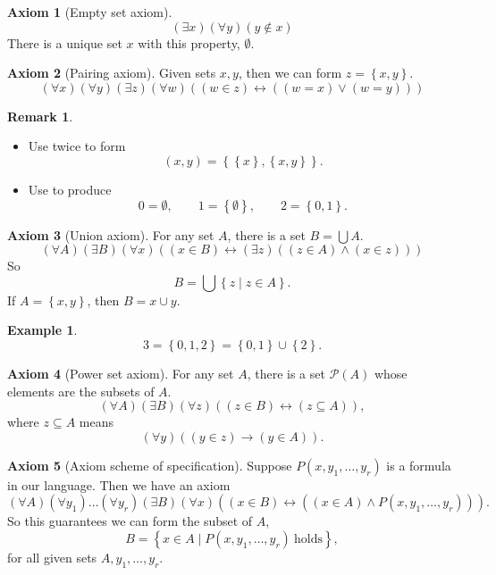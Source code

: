 \documentclass{article}
\newcommand{\rb}[1]{\left( #1 \right)}
\newcommand{\cb}[1]{\left\{ #1 \right\}}
\newcommand{\orb}[2]{\rb{#1 \lor #2}}
\newcommand{\andb}[2]{\rb{#1 \land #2}}
\newcommand{\impb}[2]{\rb{#1 \rightarrow #2}}
\newcommand{\iffb}[2]{\rb{#1 \leftrightarrow #2}}
\newcommand{\fab}[1]{\rb{\forall #1}}
\newcommand{\teb}[1]{\rb{\exists #1}}
\newcommand{\eqb}[2]{\rb{#1 = #2}}
\newcommand{\inb}[2]{\rb{#1 \in #2}}
\newcommand{\nib}[2]{\rb{#1 \notin #2}}
\newcommand{\subb}[2]{\rb{#1 \subseteq #2}}
\theoremstyle{definition}\newtheorem{definition}{Definition}[subsection]
\theoremstyle{definition}\newtheorem{remark1}[definition]{Remark}
\theoremstyle{definition}\newtheorem{example1}[definition]{Example}
\theoremstyle{definition}\newtheorem*{remark2}{Remark}
\theoremstyle{definition}\newtheorem*{example2}{Example}
\theoremstyle{definition}\newtheorem*{note}{Note}
\theoremstyle{definition}\newtheorem*{notation}{Notation}
\newtheorem{axiom}{Axiom}
\begin{document}
\begin{axiom}[Empty set axiom]
$$ \teb{x}\fab{y}\nib{y}{x} $$
There is a unique set $ x $ with this property, $ \emptyset $.
\end{axiom}


\begin{axiom}[Pairing axiom]
Given sets $ x, y $, then we can form $ z = \cb{x, y} $.
$$ \fab{x}\fab{y}\teb{z}\fab{w}\iffb{\inb{w}{z}}{\orb{\eqb{w}{x}}{\eqb{w}{y}}} $$
\end{axiom}

\begin{remark2}
\hfill
\begin{itemize}
\item Use twice to form
$$ \rb{x, y} = \cb{\cb{x}, \cb{x, y}}. $$
\item Use to produce
$$ 0 = \emptyset, \qquad 1 = \cb{\emptyset}, \qquad 2 = \cb{0, 1}. $$
\end{itemize}
\end{remark2}

\begin{axiom}[Union axiom]
For any set $ A $, there is a set $ B = \bigcup A $.
$$ \fab{A}\teb{B}\fab{x}\iffb{\inb{x}{B}}{\teb{z}\andb{\inb{z}{A}}{\inb{x}{z}}} $$
So
$$ B = \bigcup \cb{z \mid z \in A}. $$
If $ A = \cb{x, y} $, then $ B = x \cup y $.
\end{axiom}

\begin{example2}
$$ 3 = \cb{0, 1, 2} = \cb{0, 1} \cup \cb{2}. $$
\end{example2}

\begin{axiom}[Power set axiom]
For any set $ A $, there is a set $ \mathcal{P}\rb{A} $ whose elements are the subsets of $ A $.
$$ \fab{A}\teb{B}\fab{z}\iffb{\inb{z}{B}}{\subb{z}{A}}, $$
where $ z \subseteq A $ means
$$ \fab{y}\impb{\inb{y}{z}}{\inb{y}{A}}. $$
\end{axiom}

\pagebreak

\begin{axiom}[Axiom scheme of specification]
Suppose $ P\rb{x, y_1, \dots, y_r} $ is a formula in our language. Then we have an axiom
$$ \fab{A}\fab{y_1} \dots \fab{y_r}\teb{B}\fab{x}\iffb{\inb{x}{B}}{\andb{\inb{x}{A}}{P\rb{x, y_1, \dots, y_r}}}. $$
So this guarantees we can form the subset of $ A $,
$$ B = \cb{x \in A \mid P\rb{x, y_1, \dots, y_r} \ \text{holds}}, $$
for all given sets $ A, y_1, \dots, y_r $.
\end{axiom}
\end{document}
